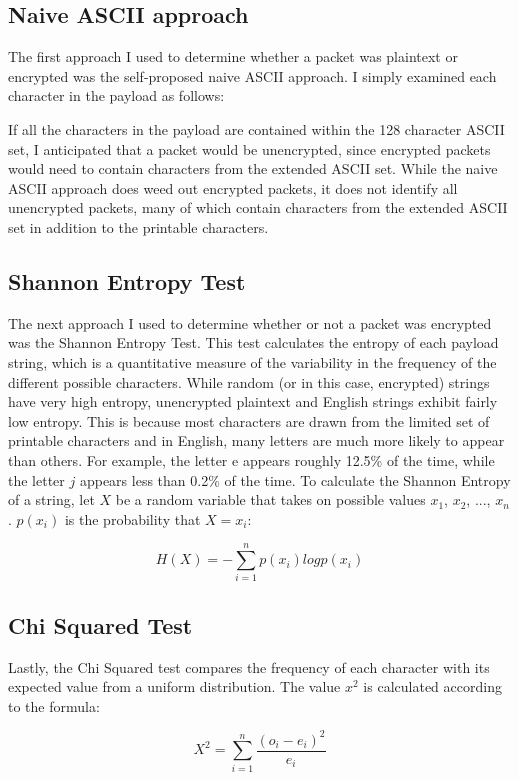 \subsection{Naive ASCII approach}
The first approach I used to determine whether a packet was plaintext or encrypted was the self-proposed naive ASCII approach. I simply examined each character in the payload as follows:


If all the characters in the payload are contained within the 128 character ASCII set, I anticipated that a packet would be unencrypted, since encrypted packets would need to contain characters from the extended ASCII set. While the naive ASCII approach does weed out encrypted packets, it does not identify all unencrypted packets, many of which contain characters from the extended ASCII set in addition to the printable characters. 

\subsection{Shannon Entropy Test}
The next approach I used to determine whether or not a packet was encrypted was the Shannon Entropy Test. This test calculates the entropy of each payload string, which is a quantitative measure of the variability in the frequency of the different possible characters. While random (or in this case, encrypted) strings have very high entropy, unencrypted plaintext and English strings exhibit fairly low entropy. This is because most characters are drawn from the limited set of printable characters and in English, many letters are much more likely to appear than others. For example, the letter e appears roughly 12.5\% of the time, while the letter $j$ appears less than 0.2\% of the time. To calculate the Shannon Entropy of a string, let $X$ be a random variable that takes on possible values $x_1$, $x_2$, ..., $x_n$. $p(x_i)$ is the probability that $X = x_i$:

$$H(X) = - \sum_{i = 1}^{n} p(x_i) log p(x_i)$$

\subsection{Chi Squared Test}
Lastly, the Chi Squared test compares the frequency of each character with its expected value from a uniform distribution. The value $x^2$ is calculated according to the formula:

$$X^2 = \sum_{i=1}^{n} \frac{(o_i-e_i)^2}{e_i}$$

